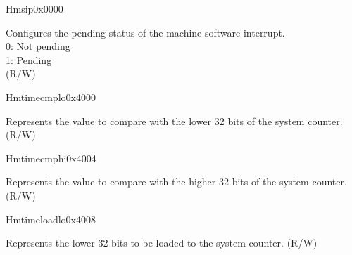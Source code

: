 
\begin{register}{H}{msip}{0x0000}\label{regdesc:CLINTMSIPREG}
%
%
\regnewline%
\begin{regdesc}
\begin{reglist}
\label{fielddesc:CLINTMSIP}\item[MSIP] Configures the pending status of the machine software interrupt.\\
0: Not pending\\
1: Pending\\
(R/W)
\end{reglist}
\end{regdesc}
\end{register}

\begin{register}{H}{mtimecmplo}{0x4000}\label{regdesc:CLINTMTIMECMPLOREG}
%
\regnewline%
\begin{regdesc}
\begin{reglist}
\label{fielddesc:CLINTMTIMECMPLO}\item [MTIMECMPLO] Represents the value to compare with the lower 32 bits of the system counter. (R/W)
\end{reglist}
\end{regdesc}
\end{register}

\begin{register}{H}{mtimecmphi}{0x4004}\label{regdesc:CLINTMTIMECMPHIREG}
%
\regnewline%
\begin{regdesc}
\begin{reglist}
\label{fielddesc:CLINTMTIMECMPHI}\item [MTIMECMPHI] Represents the value to compare with the higher 32 bits of the system counter. (R/W)
\end{reglist}
\end{regdesc}
\end{register}


\begin{register}{H}{mtimeloadlo}{0x4008}\label{regdesc:CLINTMTIMELOADLOREG}
%
\regnewline%
\begin{regdesc}
\begin{reglist}
\label{fielddesc:CLINTMTIMELOADLO}\item [MTIME\_LOADLO] Represents the lower 32 bits to be loaded to the system counter. (R/W)
\end{reglist}
\end{regdesc}
\end{register}

